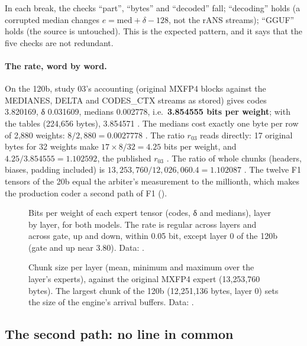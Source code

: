 In each break, the checks ``part'', ``bytes'' and ``decoded'' fall; ``decoding'' holds (a corrupted median changes $e = \text{med} + \delta - 128$, not the rANS streams); ``GGUF'' holds (the source is untouched). This is the expected pattern, and it says that the five checks are not redundant.

\paragraph{The rate, word by word.} On the 120b, study 03's accounting (original MXFP4 blocks against the MEDIANES, DELTA and CODES\_CTX streams as stored) gives codes 3.820169, δ 0.031609, medians 0.002778, i.e.\ \textbf{3.854555 bits per weight}; with the tables (224{,}656 bytes), 3.854571 \mes. The medians cost exactly one byte per row of 2{,}880 weights: $8/2{,}880 = 0.0027778$ \calc. The ratio $r_{03}$ reads directly: 17 original bytes for 32 weights make $17 \times 8 / 32 = 4.25$ bits per weight, and $4.25 / 3.854555 = 1.102592$, the published $r_{03}$ \calc. The ratio of whole chunks (headers, biases, padding included) is $13{,}253{,}760 / 12{,}026{,}060.4 = 1.102087$ \calc. The twelve F1 tensors of the 20b equal the arbiter's measurement to the millionth, which makes the production coder a second path of F1 ().

\begin{figure}[ht]
\centering
\TdFmtGrapheTaux
\caption[Bits per weight per tensor and layer]{Bits per weight of each expert tensor (codes, δ and medians), layer by layer, for both models. The rate is regular across layers and across gate, up and down, within 0.05 bit, except layer 0 of the 120b (gate and up near 3.80). Data: .}
\label{t2fmt:fig:taux}
\end{figure}

\begin{figure}[ht]
\centering
\TdFmtGrapheTroncons
\caption[Chunk size per layer]{Chunk size per layer (mean, minimum and maximum over the layer's experts), against the original MXFP4 expert (13{,}253{,}760 bytes). The largest chunk of the 120b (12{,}251{,}136 bytes, layer 0) sets the size of the engine's arrival buffers. Data: .}
\label{t2fmt:fig:troncons}
\end{figure}

\subsection{The second path: no line in common}

